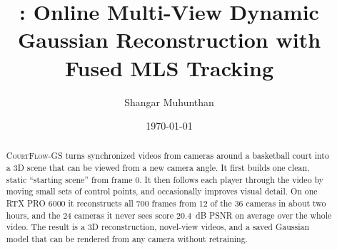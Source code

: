 \documentclass[11pt]{article}
\title{\method: Online Multi-View Dynamic Gaussian Reconstruction with Fused MLS Tracking}
\author{Shangar Muhunthan}
\date{\today}
\newcommand{\method}{\textsc{CourtFlow-GS}\xspace}
\begin{document}
\maketitle

\begin{abstract}
\method turns synchronized videos from cameras around a basketball court into a 3D scene that can
be viewed from a new camera angle. It first builds one clean, static ``starting scene'' from frame
0. It then follows each player through the video by moving small sets of control points, and
occasionally improves visual detail. On one RTX PRO 6000 it reconstructs all 700 frames from 12 of the 36 cameras
in about two hours, and the 24 cameras it never sees score 20.4~dB PSNR on average over the whole
video. The result is a 3D reconstruction, novel-view videos, and a saved Gaussian model that can be
rendered from any camera without retraining.
\end{abstract}
\end{document}
